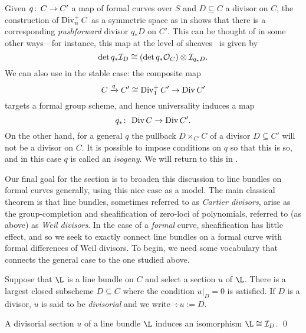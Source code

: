 \begin{remark}\label{DivHasPushforwards}
Given \(q\colon\thinspace C \to C'\) a map of formal curves over \(S\) and \(D \subseteq C\) a divisor on \(C\), the construction of \(\operatorname{Div}_n^+ C\) as a symmetric space as in  shows that there is a corresponding \textit{pushforward} divisor \(q_* D\) on \(C'\).  This can be thought of in some other ways---for instance, this map at the level of sheaves~\cite[Ch.\ IV, Exercise 2.6]{Hartshorne} is given by \[\det q_* \mathcal{I}_D \cong (\det q_* \mathcal{O}_C) \otimes \mathcal{I}_{q_* D}.\]  We can also use  in the stable case: the composite map \[C \xrightarrow{q} C' \cong \operatorname{Div}_1^+ C' \to \operatorname{Div} C'\] targets a formal group scheme, and hence universality induces a map \[q_*\colon\thinspace \operatorname{Div} C \to \operatorname{Div} C'.\]  On the other hand, for a general \(q\) the pullback \(D \times_{C'} C\) of a divisor \(D \subseteq C'\) will not be a divisor on \(C\).  It is possible to impose conditions on \(q\) so that this is so, and in this case \(q\) is called an \textit{isogeny}.  We will return to this in .
\end{remark}

Our final goal for the section is to broaden this discussion to line bundles on formal curves generally, using this nice case as a model.  The main classical theorem is that line bundles, sometimes referred to as \textit{Cartier divisors}, arise as the group-completion and sheafification of zero-loci of polynomials, referred to (as above) as \textit{Weil divisors}.  In the case of a \emph{formal} curve, sheafification has little effect, and so we seek to exactly connect line bundles on a formal curve with formal differences of Weil divisors.  To begin, we need some vocabulary that connects the general case to the one studied above.

\begin{definition}\label{DivisorialDefn}
Suppose that \(\L\) is a line bundle on \(C\) and select a section \(u\) of \(\L\).  There is a largest closed subscheme \(D \subseteq C\) where the condition \(u|_D = 0\) is satisfied.  If \(D\) is a divisor, \(u\) is said to be \textit{divisorial} and we write \(\div u := D\).
\end{definition}

\begin{lemma}
A divisorial section \(u\) of a line bundle \(\L\) induces an isomorphism \(\L \cong \sheaf I_D\). \qed
\end{lemma}

